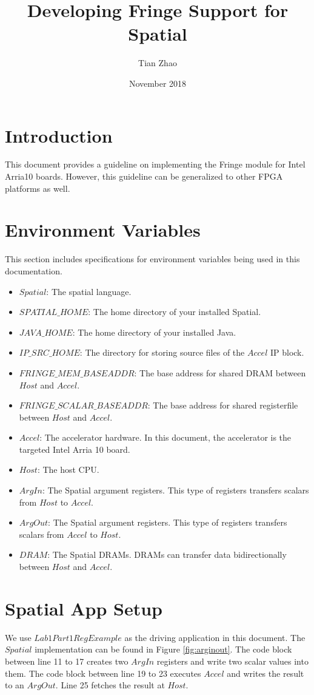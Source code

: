 \documentclass{article}
\title{Developing Fringe Support for Spatial}
\author{Tian Zhao}
\date{November 2018}
\begin{document}
\maketitle

\section{Introduction}
This document provides a guideline on implementing the Fringe module for Intel Arria10 boards.
However, this guideline can be generalized to other FPGA platforms as well.

\section{Environment Variables}
This section includes specifications for environment variables being used in this documentation.
\begin{itemize}
    \item $Spatial$: The spatial language.
    \item $SPATIAL\_HOME$: The home directory of your installed Spatial.
    \item $JAVA\_HOME$: The home directory of your installed Java.
    \item $IP\_SRC\_HOME$: The directory for storing source files of the $Accel$ IP block.
    \item $FRINGE\_MEM\_BASEADDR$: The base address for shared DRAM between $Host$ and $Accel$.
    \item $FRINGE\_SCALAR\_BASEADDR$: The base address for shared registerfile between $Host$ and $Accel$.
    \item $Accel$: The accelerator hardware. In this document, the accelerator is the targeted Intel Arria 10 board.
    \item $Host$: The host CPU.
    \item $ArgIn$: The Spatial argument registers. This type of registers transfers scalars from $Host$ to $Accel$.
    \item $ArgOut$: The Spatial argument registers. This type of registers transfers scalars from $Accel$ to $Host$.
    \item $DRAM$: The Spatial DRAMs. DRAMs can transfer data bidirectionally between $Host$ and $Accel$.
\end{itemize}

\section{Spatial App Setup}
We use $Lab1Part1RegExample$ as the driving application in this document.
The $Spatial$ implementation can be found in Figure \ref{fig:arginout}.
The code block between line 11 to 17 creates two $ArgIn$ registers and write two scalar values into them.
The code block between line 19 to 23 executes $Accel$ and writes the result to an $ArgOut$.
Line 25 fetches the result at $Host$.
\end{document}

